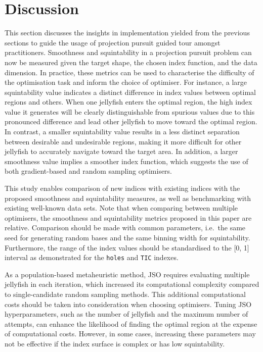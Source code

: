 \documentclass[
  12pt,
]{interact}
\theoremstyle{plain}
\begin{document}
\hypertarget{sec-discussion}{%
\section{Discussion}\label{sec-discussion}}

This section discusses the insights in implementation yielded from the
previous sections to guide the usage of projection pursuit guided tour
amongst practitioners. Smoothness and squintability in a projection
pursuit problem can now be measured given the target shape, the chosen
index function, and the data dimension. In practice, these metrics can
be used to characterise the difficulty of the optimisation task and
inform the choice of optimiser. For instance, a large squintability
value indicates a distinct difference in index values between optimal
regions and others. When one jellyfish enters the optimal region, the
high index value it generates will be clearly distinguishable from
spurious values due to this pronounced difference and lead other
jellyfish to move toward the optimal region. In contrast, a smaller
squintability value results in a less distinct separation between
desirable and undesirable regions, making it more difficult for other
jellyfish to accurately navigate toward the target area. In addition, a
larger smoothness value implies a smoother index function, which
suggests the use of both gradient-based and random sampling optimisers.

This study enables comparison of new indices with existing indices with
the proposed smoothness and squintability measures, as well as
benchmarking with existing well-known data sets. Note that when
comparing between multiple optimisers, the smoothness and squintability
metrics proposed in this paper are relative. Comparison should be made
with common parameters, i.e.~the same seed for generating random bases
and the same binning width for squintability. Furthermore, the range of
the index values should be standardised to the {[}0, 1{]} interval as
demonstrated for the \texttt{holes} and \texttt{TIC} indexes.

As a population-based metaheuristic method, JSO requires evaluating
multiple jellyfish in each iteration, which increased its computational
complexity compared to single-candidate random sampling methods. This
additional computational costs should be taken into consideration when
choosing optimisers. Tuning JSO hyperparameters, such as the number of
jellyfish and the maximum number of attempts, can enhance the likelihood
of finding the optimal region at the expense of computational costs.
However, in some cases, increasing these parameters may not be effective
if the index surface is complex or has low squintability.
\end{document}

